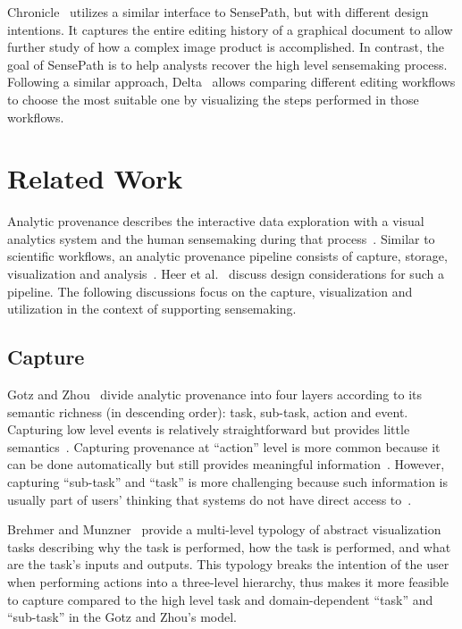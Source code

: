 Chronicle~\cite{Grossman2010} utilizes a similar interface to SensePath, but with different design intentions. It captures the entire editing history of a graphical document to allow further study of how a complex image product is accomplished. In contrast, the goal of SensePath is to help analysts recover the high level sensemaking process. Following a similar approach, Delta~\cite{Kong2012} allows comparing different editing workflows to choose the most suitable one by visualizing the steps performed in those workflows. 



\section{Related Work}
Analytic provenance describes the interactive data exploration with a visual analytics system and the human sensemaking during that process~\cite{Xu2015}. Similar to scientific workflows, an analytic provenance pipeline consists of capture, storage, visualization and analysis~\cite{North2011}. Heer et al.~\cite{Heer2008} discuss design considerations for such a pipeline. The following discussions focus on the capture, visualization and utilization in the context of supporting sensemaking.

\subsection{Capture}
Gotz and Zhou~\cite{Gotz2009} divide analytic provenance into four layers according to its semantic richness (in descending order): task, sub-task, action and event. Capturing low level events is relatively straightforward but provides little semantics~\cite{Cowley2006}. Capturing provenance at ``action'' level is more common because it can be done automatically but still provides meaningful information~\cite{Shrinivasan2008, Nguyen2016}. However, capturing ``sub-task'' and ``task'' is more challenging because such information is usually part of users' thinking that systems do not have direct access to~\cite{Gotz2009,Xu2014}.

Brehmer and Munzner~\cite{Brehmer2013} provide a multi-level typology of abstract visualization tasks describing why the task is performed, how the task is
performed, and what are the task’s inputs and outputs. This typology breaks the intention of the user when performing actions into a three-level hierarchy, thus makes it more feasible to capture compared to the high level task and domain-dependent ``task'' and ``sub-task'' in the Gotz and Zhou's model.

